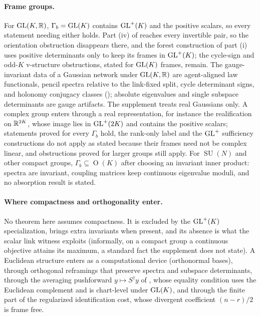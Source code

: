 \paragraph{Frame groups.} For \(\mathrm{GL}(K,\mathbb R)\), \(\Gamma_b=\mathrm{GL}(K)\) contains \(\mathrm{GL}^+(K)\) and the positive
scalars, so every statement needing either holds. Part (iv) of  reaches
every invertible pair, so the orientation obstruction disappears there, and the forest construction of
part (i) uses positive determinants only to keep its frames in \(\mathrm{GL}^+(K)\); the cycle-sign and
odd-\(K\) v-structure obstructions, stated for \(\mathrm{GL}(K)\) frames, remain. The gauge-invariant data of a Gaussian network under \(\mathrm{GL}(K,\mathbb R)\) are agent-aligned
law functionals, pencil spectra relative to the link-fixed split, cycle determinant signs, and holonomy
conjugacy classes (); absolute eigenvalues and single subspace
determinants are gauge artifacts. The supplement treats real Gaussians only. A complex group enters
through a real representation, for instance the realification on \(\mathbb R^{2K}\), whose image lies in
\(\mathrm{GL}^+(2K)\) and contains the positive scalars; statements proved for every \(\Gamma_b\) hold, the
rank-only label and the \(\mathrm{GL}^+\) sufficiency constructions do not apply as stated because their frames
need not be complex linear, and obstructions proved for larger groups still apply. For
\(\operatorname{SU}(N)\) and other compact groups, \(\Gamma_b\subseteq\operatorname{O}(K)\) after
choosing an invariant inner product: spectra are invariant, coupling matrices keep continuous eigenvalue
moduli, and no absorption result is stated.

\paragraph{Where compactness and orthogonality enter.} No theorem here assumes compactness. It is
excluded by the \(\mathrm{GL}^+(K)\) specialization, brings extra invariants when present, and its absence is
what the scalar link witness exploits (informally, on a compact group a continuous objective attains its
maximum, a standard fact the supplement does not state). A Euclidean structure enters as a computational
device (orthonormal bases), through orthogonal reframings that preserve spectra and subspace
determinants, through the averaging pushforward \(y\mapsto S^\dagger y\) of
, whose equality condition uses the Euclidean complement
and is chart-level under \(\mathrm{GL}(K)\), and through the finite part of the regularized identification cost,
whose divergent coefficient \((n-r)/2\) is frame free.

